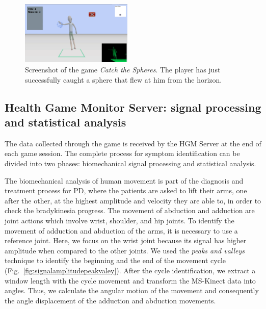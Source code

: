 \documentclass[10pt, conference, compsocconf]{IEEEtran}
\begin{document}
\begin{figure}[!htb]
	\centering
	\includegraphics[width=0.475\textwidth]{img/catch_colour.png}
	\caption{Screenshot of the game \emph{Catch the Spheres}. The
		player has just successfully caught a sphere that flew at him from the
		horizon.}
	\label{img:catch}
\end{figure}

\subsection{Health Game Monitor Server: signal processing and statistical analysis}

The data collected through the game is received by the HGM Server at the end of each game session. The complete process for symptom identification can be divided into two phases: biomechanical signal processing and statistical analysis. 

The biomechanical analysis of human movement is part of the diagnosis and treatment process for PD, where the patients are asked to lift their arms, one after the other, at the highest amplitude and velocity they are able to, in order to check the bradykinesia progress. The movement of abduction and adduction are joint actions which involve wrist, shoulder, and hip joints. To identify the movement of adduction and abduction of the arms, it is necessary to use a reference joint. Here, we focus on the wrist joint because its signal has higher amplitude when compared to the other joints. We used the \textit{peaks and valleys} technique to identify the beginning and the end of the movement cycle (Fig.~\ref{fig:signalamplitudepeakvaley}). After the cycle identification, we extract a window length with the cycle movement and transform the MS-Kinect data into angles. Thus, we calculate the angular motion of the movement and consequently the angle displacement of the adduction and abduction movements.
\end{document}
